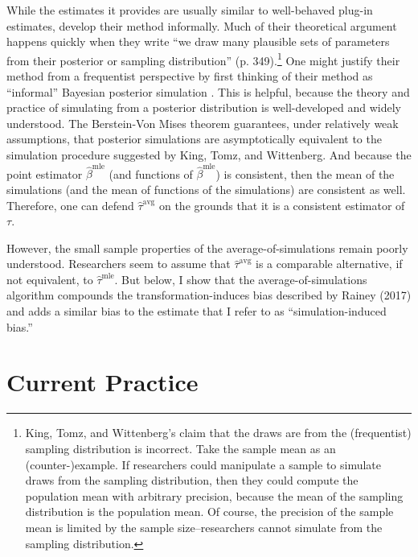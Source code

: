 \documentclass[12pt]{article}
\begin{document}
While the estimates it provides are usually similar to well-behaved plug-in estimates, \cite{KingTomzWittenberg2000} develop their method informally. 
Much of their theoretical argument happens quickly when they write ``we draw many plausible sets of parameters from their posterior or sampling distribution'' (p. 349).\footnote{King, Tomz, and Wittenberg's claim that the draws are from the (frequentist) sampling distribution is incorrect. Take the sample mean as an (counter-)example. If researchers could manipulate a sample to simulate draws from the sampling distribution, then they could compute the population mean with arbitrary precision, because the mean of the sampling distribution is the population mean. Of course, the precision of the sample mean is limited by the sample size--researchers cannot simulate from the sampling distribution.}
One might justify their method from a frequentist perspective by first thinking of their method as ``informal'' Bayesian posterior simulation \citep{GelmanHill2006}.  
This is helpful, because the theory and practice of simulating from a posterior distribution is well-developed and widely understood. 
The Berstein-Von Mises theorem \citep[pp.\@ 140-146]{vanderVaart2000} guarantees, under relatively weak assumptions, that posterior simulations are asymptotically equivalent to the simulation procedure suggested by King, Tomz, and Wittenberg. And because the point estimator $\hat{\beta}^{\text{mle}}$ (and functions of $\hat{\beta}^{\text{mle}}$) is consistent, then the mean of the simulations (and the mean of functions of the simulations) are consistent as well. Therefore, one can defend $\hat{\tau}^{\text{avg}}$ on the grounds that it is a consistent estimator of $\tau$. 

However, the small sample properties of the average-of-simulations remain poorly understood. Researchers seem to assume that $\hat{\tau}^{\text{avg}}$ is a comparable alternative, if not equivalent, to  $\hat{\tau}^{\text{mle}}$. 
But below, I show that the average-of-simulations algorithm compounds the transformation-induces bias described by Rainey (2017) and adds a similar bias to the estimate that I refer to as ``simulation-induced bias.'' 

\section*{Current Practice}
\end{document}
